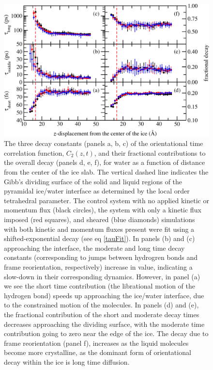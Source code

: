 \documentclass[aps,jcp,preprint,showpacs,superscriptaddress,groupedaddress]{revtex4}  %
\begin{document}
\begin{figure}
\includegraphics[width=\linewidth]{pyramidal_lcorrz}
\caption{\label{fig:PyrOrient} The three decay constants (panels a, b, c)
  of the orientational time correlation function, $C_2(z,t)$, 
  and their fractional contributions to the overall decay (panels d, e, f), 
  for water as a
  function of distance from the center of the ice slab. The vertical
  dashed line indicates the Gibb's dividing surface of the solid and liquid
  regions of the pyramidal ice/water interface as determined
  by the local order tetrahedral parameter. The control system with no
  applied kinetic or momentum flux (black circles), the 
  system with only a kinetic flux imposed (red squares), and
  sheared (blue diamonds) simulations with both kinetic and momentum fluxes
  present were fit using a shifted-exponential decay (see eq \eqref{tauFit}).
  In panels (b) and (c) approaching the interface, the moderate and long time 
  decay constants 
  (corresponding to jumps between hydrogren bonds and frame reorientation, 
  respectively) increase in value, indicating a slow-down in their 
  corresponding dynamics. However, in panel (a) we see the short time 
  contribution (the librational motion of the hydrogen bond) speeds up 
  approaching the ice/water interface, due to the constrained motion of the
  molecules. In panels (d) and (e), the fractional contribution of the short 
  and moderate decay times decreases approaching the dividing surface, with
  the moderate time contribution going to zero near the edge of the ice. The
  decay due to frame reorientation (panel f), increases as the liquid 
  molecules become more crystalline, as the dominant form of orientational 
  decay within the ice is long time diffusion.}
\end{figure}
\end{document}
